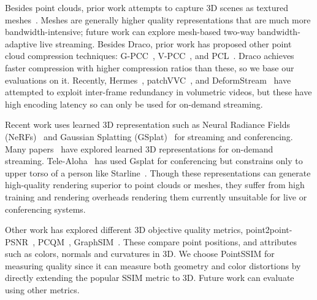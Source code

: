%
Besides point clouds, prior work attempts to capture 3D scenes as textured meshes~\cite{kinectfusion,fvv,holoportation,fusion4d,dynamic-fusion,meshreduce}.
%
%
Meshes are generally higher quality representations that are much more bandwidth-intensive; future work can explore mesh-based two-way bandwidth-adaptive live streaming.
%
Besides Draco, prior work has proposed other point cloud compression techniques: G-PCC~\cite{gpcc}, V-PCC~\cite{vpcc}, and PCL~\cite{pcl}. 
%
Draco achieves faster compression with higher compression ratios than these, so we base our evaluations on it.
%
Recently, Hermes~\cite{hermes}, patchVVC~\cite{patchvvc}, and DeformStream~\cite{deformstream} have attempted to exploit inter-frame redundancy in volumetric videos, but these have high encoding latency so can only be used for on-demand streaming.

Recent work uses learned 3D representation such as Neural Radiance Fields (NeRFs)~\cite{nerf} and Gaussian Splatting (GSplat)~\cite{gsplat} for streaming and conferencing.
%
%
Many papers~\cite{nerf-nossdav, nerf-ems1, nerf-ems2, swings, telepresence-tvcg, 3dgstream, queen, streamrf} have explored learned 3D representations for on-demand streaming. 
%
Tele-Aloha~\cite{tele-aloha} has used Gsplat for conferencing but constrains only to upper torso of a person like Starline~\cite{starline}.
%
Though these representations can generate high-quality rendering superior to point clouds or meshes, they suffer from high training and rendering overheads rendering them currently unsuitable for live or conferencing systems. 
%

%
Other work has explored different 3D objective quality metrics, point2point-PSNR~\cite{dong-tian}, PCQM~\cite{pcqm}, GraphSIM~\cite{graphsim}.
%
These compare point positions, and attributes such as colors, normals and curvatures in 3D. 
%
We choose PointSSIM for measuring quality since it can measure both geometry and color distortions by directly extending the popular SSIM metric to 3D. 
%
Future work can evaluate \livo{} using other metrics.

